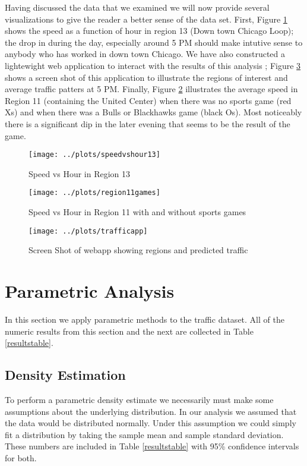 \documentclass[12pt]{article}
\begin{document}
Having discussed the data that we examined we will now provide several visualizations to give the reader a better sense of the data set. First, Figure \ref{speedvshour13} shows the speed as a function of hour in region 13 (Down town Chicago Loop); the drop in during the day, especially around 5 PM should make intutive sense to anybody who has worked in down town Chicago. We have also constructed a lightewight web application to interact with the results of this analysis \cite{trafficapp}; Figure \ref{appscreenshot} shows a screen shot of this application to illustrate the regions of interest and average traffic patters at 5 PM. Finally, Figure \ref{region11games} illustrates the average speed in Region 11 (containing the United Center) when there was no sports game (red Xs) and when there was a Bulls or Blackhawks game (black Os). Most noticeably there is a significant dip in the later evening that seems to be the result of the game.

\begin{figure}[!ht]
\centering
\texttt{[image: ../plots/speedvshour13]}
\caption{Speed vs Hour in Region 13}
\label{speedvshour13}
\end{figure}

\begin{figure}[!ht]
\centering
\texttt{[image: ../plots/region11games]}
\caption{Speed vs Hour in Region 11 with and without sports games}
\label{region11games}
\end{figure}

\begin{figure}[!ht]
\centering
\texttt{[image: ../plots/trafficapp]}
\caption{Screen Shot of webapp showing regions and predicted traffic}
\label{appscreenshot}
\end{figure}

\section{Parametric Analysis}
In this section we apply parametric methods to the traffic dataset. All of the numeric results from this section and the next are collected in Table \ref{resultstable}.
\subsection{Density Estimation}
To perform a parametric density estimate we necessarily must make some assumptions about the underlying distribution. In our analysis we assumed that the data would be distributed normally. Under this assumption we could simply fit a distribution by taking the sample mean and sample standard deviation. These numbers are included in Table \ref{resultstable} with 95\% confidence intervals for both.
\end{document}

